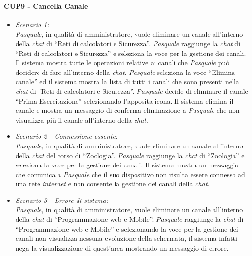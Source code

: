 \paragraph{CUP9 - Cancella Canale\\}
\begin{itemize}
	\item \textit{Scenario 1:\\}
	\textit{Pasquale}, in qualità di amministratore, vuole eliminare un canale all’interno della \textit{chat} di “Reti di calcolatori e Sicurezza”. \textit{Pasquale} raggiunge la \textit{chat} di “Reti di calcolatori e Sicurezza” e seleziona la voce per la gestione dei canali. Il sistema mostra tutte le operazioni relative ai canali che \textit{Pasquale} può decidere di fare all’interno della \textit{chat}. 
	\textit{Pasquale} seleziona la voce “Elimina canale” ed il sistema mostra la lista di tutti i canali che sono presenti nella \textit{chat} di “Reti di calcolatori e Sicurezza”. \textit{Pasquale} decide di eliminare il canale “Prima Esercitazione” selezionando l’apposita icona. 
	Il sistema elimina il canale e mostra un messaggio di conferma eliminazione a \textit{Pasquale} che non visualizza più il canale all’interno della \textit{chat}.\\
	
	\item \textit{Scenario 2 - Connessione assente:\\}
	\textit{Pasquale,} in qualità di amministratore, vuole eliminare un canale all’interno della \textit{chat} del corso di “Zoologia”. \textit{Pasquale} raggiunge la \textit{chat} di “Zoologia” e seleziona la voce per la gestione dei canali. Il sistema mostra un messaggio che comunica a \textit{Pasquale} che il suo dispositivo non risulta essere connesso ad una rete \textit{internet} e non consente la gestione dei canali della \textit{chat}.\\ 
	
	\item \textit{Scenario 3 - Errore di sistema:\\}
	\textit{Pasquale}, in qualità di amministratore, vuole eliminare un canale all’interno della \textit{chat} di “Programmazione web e Mobile”. \textit{Pasquale} raggiunge la \textit{chat} di “Programmazione web e Mobile” e selezionando la voce per la gestione dei canali non visualizza nessuna evoluzione della schermata, il sistema infatti nega la visualizzazione di quest’area mostrando un messaggio di errore.\\
	

\end{itemize}
